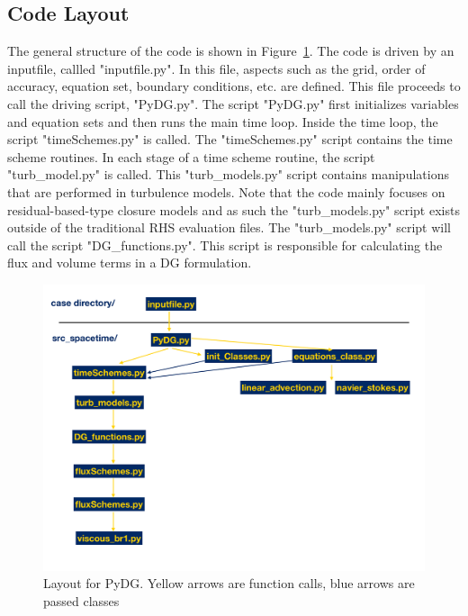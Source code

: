 \documentclass[times,12pt]{article}%
\begin{document}
\subsection{Code Layout}
The general structure of the code is shown in Figure~\ref{fig:layout}. The code is driven by an inputfile, callled "inputfile.py". In this file, aspects such as the grid, order of accuracy, equation set, boundary conditions, etc. are defined. This file proceeds to call the driving script, "PyDG.py". The script "PyDG.py" first initializes variables and equation sets and then runs the main time loop. Inside the time loop, the script "timeSchemes.py" is called. The "timeSchemes.py" script contains the time scheme routines. In each stage of a time scheme routine, the script "turb\_model.py" is called. This "turb\_models.py" script contains manipulations that are performed in turbulence models. Note that the code mainly focuses on residual-based-type closure models and as such the "turb\_models.py" script exists outside of the traditional RHS evaluation files. The "turb\_models.py" script will call the script "DG\_functions.py". This script is responsible for calculating the flux and volume terms in a DG formulation. 
\begin{figure}[h]
\includegraphics[trim={0.05cm 0 1.75cm 1cm},clip,width=1.\linewidth]{figs/pydg_layout.pdf}
\caption{Layout for PyDG. Yellow arrows are function calls, blue arrows are passed classes}
\label{fig:layout}
\end{figure}
 
 
\end{document}
